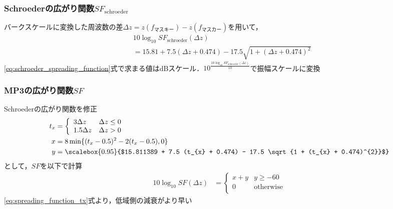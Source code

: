 \documentclass[14pt,xcolor=dvipsnames,table,dvipdfmx]{beamer}
\begin{document}
\begin{frame}[c]
    \frametitle{Schroederの広がり関数$SF_{\mathrm{schroeder}}$\cite{schroeder1979optimizing}}
    バークスケールに変換した周波数の差$\Delta z = z(f_{\text{マスキー}}) - z(f_{\text{マスカー}})$を用いて，
    \begin{align}
        & 10 \log_{10} SF_{\mathrm{schroeder}}(\Delta z) \nonumber \\
        & = 15.81 + 7.5 (\Delta z + 0.474) - 17.5 \sqrt{ 1 + (\Delta z + 0.474)^{2} } \label{eq:schroeder_spreading_function}
    \end{align}
    \eqref{eq:schroeder_spreading_function}式で求まる値はdBスケール．$10^{\frac{10 \log_{10} SF_{\mathrm{schroeder}}(\Delta z)}{10}}$で振幅スケールに変換
\end{frame}

\begin{frame}[c]
    \frametitle{MP3の広がり関数$SF$}
    Schroederの広がり関数を修正
    \begin{align}
        t_{x} &= \left\{ \begin{array}{ll}
            3\Delta z & \Delta z \leq 0 \\
            1.5\Delta z & \Delta z > 0 \\
        \end{array} \right. \label{eq:spreading_function_tx} \\
        x &= 8 \min \{ (t_{x} - 0.5)^{2} - 2 (t_{x} - 0.5), 0 \} \\
        y &= \scalebox{0.95}{$15.811389 + 7.5 (t_{x} + 0.474) - 17.5 \sqrt{1 + (t_{x} + 0.474)^{2}}$}
    \end{align}
    として，$SF$を以下で計算
    \begin{align}
        10 \log_{10} SF(\Delta z) &= \left\{ \begin{array}{ll}
            x + y & y \geq -60 \\
            0 & \text{otherwise} \\
        \end{array} \right.
    \end{align}
    \eqref{eq:spreading_function_tx}式より，低域側の減衰がより早い
\end{frame}
\end{document}
